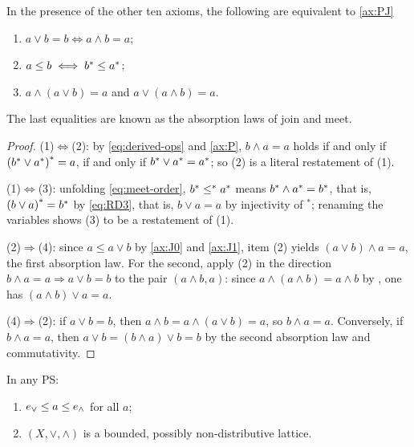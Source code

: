 \begin{proposition}\label{prop:order-compat}
In the presence of the other ten axioms, the following are equivalent to \eqref{ax:PJ}
\begin{enumerate}
  \item $a \vee b = b \iff a \wedge b = a$;
  \item $a \leq b \iff {b}^{*} \leq {a}^{*}$;
  \item $a \wedge (a \vee b) = a$ and
        $a \vee (a \wedge b) = a$.
\end{enumerate}
The last equalities are known as the absorption laws of join and meet.
\end{proposition}

\begin{proof}
(1)$\Leftrightarrow$(2): by \eqref{eq:derived-ops} and \eqref{ax:P},
$b \wedge a = a$ holds if and only if
${({b}^{*} \vee {a}^{*})}^{*} = a$, if and only if
${b}^{*} \vee {a}^{*} = {a}^{*}$; so (2) is a literal restatement of
(1).

(1)$\Leftrightarrow$(3): unfolding \eqref{eq:meet-order},
${b}^{*} \leq^{*} {a}^{*}$ means ${b}^{*} \wedge {a}^{*} = {b}^{*}$,
that is, ${(b \vee a)}^{*} = {b}^{*}$ by \eqref{eq:RD3}, that is,
$b \vee a = a$ by injectivity of ${}^{*}$; renaming the variables shows (3) to
be a restatement of (1).

(2)$\Rightarrow$(4): since $a \leq a \vee b$ by \eqref{ax:J0} and
\eqref{ax:J1}, item (2) yields $(a \vee b) \wedge a = a$, the first
absorption law. For the second, apply (2) in the direction
$b \wedge a = a \Rightarrow a \vee b = b$ to the pair $(a \wedge b, a)$: since
$a \wedge (a \wedge b) = a \wedge b$ by , one has
$(a \wedge b) \vee a = a$.

(4)$\Rightarrow$(2): if $a \vee b = b$, then
$a \wedge b = a \wedge (a \vee b) = a$, so $b \wedge a = a$. Conversely, if
$b \wedge a = a$, then $a \vee b = (b \wedge a) \vee b = b$ by the second
absorption law and commutativity.
\end{proof}

\begin{proposition}\label{prop:order-structure}
In any PS:
\begin{enumerate}
  \item $e_{\vee} \leq a \leq e_{\wedge}$ for all $a$;
  \item $(X,\vee,\wedge)$ is a bounded, possibly non-distributive lattice.
\end{enumerate}
\end{proposition}

